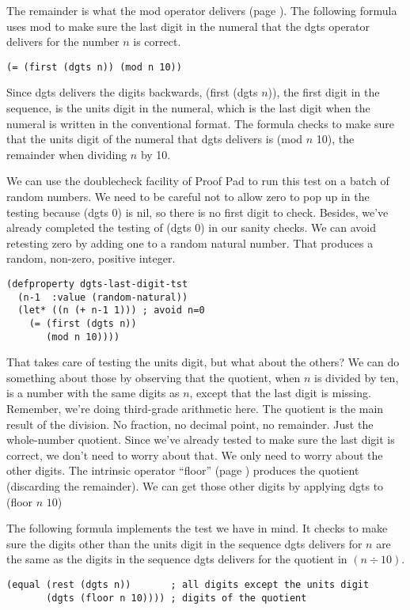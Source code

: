 The remainder is
what the mod operator delivers (page \pageref{mod-function}).
The following formula uses mod to make sure the last digit in the numeral
that the dgts operator delivers for the number $n$ is correct.
\begin{Verbatim}
(= (first (dgts n)) (mod n 10))
\end{Verbatim}

Since dgts delivers the digits backwards,
(first (dgts $n$)), the first digit in the sequence,
is the units digit in the numeral, which is the last digit
when the numeral is written in the conventional format.
The formula checks to make sure that
the units digit of the numeral that dgts delivers is (mod $n$ 10),
the remainder when dividing $n$ by 10.

We can use the doublecheck facility of Proof Pad to run this test on a batch of random numbers.
We need to be careful not to allow zero to pop up in the testing
because (dgts 0) is nil, so there is no first digit to check.
Besides, we've already completed the testing of (dgts 0) in our sanity checks.
We can avoid retesting zero by adding one to a random natural number.
That produces a random, non-zero, positive integer.
\begin{Verbatim}
(defproperty dgts-last-digit-tst
  (n-1  :value (random-natural))
  (let* ((n (+ n-1 1))) ; avoid n=0
    (= (first (dgts n))
       (mod n 10))))
\end{Verbatim}

That takes care of testing the units digit, but what about the others?
We can do something about those by observing that the quotient,
when $n$ is divided by ten,
is a number with the same digits as $n$,
except that the last digit is missing.
Remember, we're doing third-grade arithmetic here.
The quotient is the main result of the division.
No fraction, no decimal point, no remainder. Just the whole-number quotient.
Since we've already tested to make sure the last digit is correct,
we don't need to worry about that.
We only need to worry about the other digits.
The intrinsic operator ``floor'' (page \pageref{floor-def})
produces the quotient (discarding the remainder).
We can get those other digits by applying dgts to (floor $n$ $10$)

The following formula implements the test we have in mind.
It checks to make sure the digits other than the units digit
in the sequence dgts delivers for $n$
are the same as the digits in the sequence
dgts delivers for the quotient in $(n \div 10)$.
\begin{Verbatim}
(equal (rest (dgts n))       ; all digits except the units digit
       (dgts (floor n 10)))) ; digits of the quotient
\end{Verbatim}

